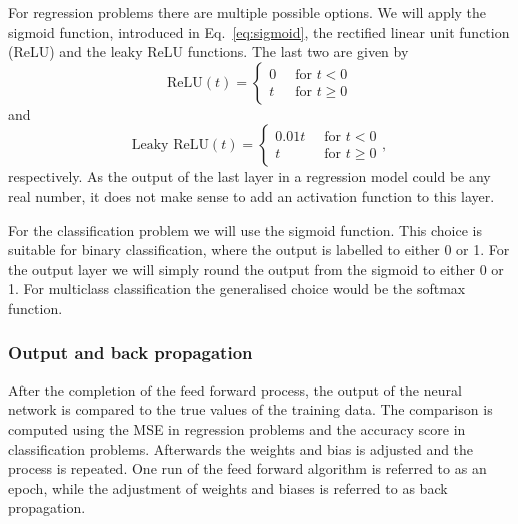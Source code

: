 \documentclass[a4paper, 
amsfonts, 
amssymb, 
amsmath, 
reprint, 
showkeys, 
nofootinbib, 
twoside]{revtex4-2}
\begin{document}
For regression problems there are multiple possible options. We will apply the sigmoid function, introduced in Eq.~\eqref{eq:sigmoid}, the rectified linear unit function (ReLU) and the leaky ReLU functions. The last two are given by
\begin{equation}
    \textrm{ReLU}(t) = 
    \begin{cases}
        0 \: &\textrm{ for } t < 0 \\
        t \: &\textrm{ for } t \geq 0
    \end{cases}
\end{equation}
and
\begin{equation}
    \textrm{Leaky ReLU}(t) = 
    \begin{cases}
        0.01t \: &\textrm{ for } t < 0 \\
        t \: &\textrm{ for } t \geq 0
    \end{cases},
\end{equation}
respectively. As the output of the last layer in a regression model could be any real number, it does not make sense to add an activation function to this layer.

For the classification problem we will use the sigmoid function. This choice is suitable for binary classification, where the output is labelled to either 0 or 1. For the output layer we will simply round the output from the sigmoid to either 0 or 1. For multiclass classification the generalised choice would be the softmax function.

\subsubsection{Output and back propagation}
After the completion of the feed forward process, the output of the neural network is compared to the true values of the training data. The comparison is computed using the MSE in regression problems and the accuracy score in classification problems. Afterwards the weights and bias is adjusted and the process is repeated. One run of the feed forward algorithm is referred to as an epoch, while the adjustment of weights and biases is referred to as back propagation.
\end{document}
